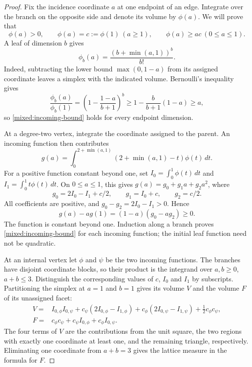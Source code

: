 \begin{proof}
Fix the incidence coordinate $a$ at one endpoint of an edge. Integrate
over the branch on the opposite side and denote its volume by
$\phi(a)$. We will prove that
\begin{equation}\label{mixed:incoming-bound}
 \phi(a)>0,\qquad \phi(a)=c:=\phi(1)\ (a\ge1),\qquad
 \phi(a)\ge ac\ (0\le a\le1).
\end{equation}
A leaf of dimension $b$ gives
\[
 \phi_b(a)=\frac{(b+\min(a,1))^b}{b!}.
\]
Indeed, subtracting the lower bound $\max(0,1-a)$ from its assigned
coordinate leaves a simplex with the indicated volume. Bernoulli's inequality
gives
\[
 \frac{\phi_b(a)}{\phi_b(1)}
 =\left(1-\frac{1-a}{b+1}\right)^b
 \ge1-\frac{b}{b+1}(1-a)\ge a,
\]
so \eqref{mixed:incoming-bound} holds for every endpoint dimension.

At a degree-two vertex, integrate the coordinate assigned to the parent.
An incoming function then contributes
\begin{equation}\label{mixed:path-operator}
 g(a)=\int_0^{2+\min(a,1)}
             (2+\min(a,1)-t)\phi(t)\,dt.
\end{equation}
For a positive function constant beyond one, set
$I_0=\int_0^1\phi(t)\,dt$ and $I_1=\int_0^1t\phi(t)\,dt$.
On $0\le a\le1$, this gives $g(a)=g_0+g_1a+g_2a^2$, where
\[
 g_0=2I_0-I_1+c/2,\qquad g_1=I_0+c,\qquad g_2=c/2.
\]
All coefficients are positive, and $g_0-g_2=2I_0-I_1>0$. Hence
\[
 g(a)-ag(1)=(1-a)(g_0-ag_2)\ge0.
\]
The function is constant beyond one. Induction along a branch proves
\eqref{mixed:incoming-bound} for each incoming function; the initial
leaf function need not be quadratic.

At an internal vertex let $\phi$ and $\psi$ be the two incoming
functions. The branches have disjoint coordinate blocks, so their
product is the integrand over $a,b\ge0$, $a+b\le3$. Distinguish the corresponding values of $c$, $I_0$ and $I_1$ by
subscripts. Partitioning the simplex at $a=1$ and $b=1$ gives its
volume $V$ and the volume $F$ of its unassigned facet:
\begin{align}
 V={}&I_{0,\phi}I_{0,\psi}
   +c_\psi(2I_{0,\phi}-I_{1,\phi})
   +c_\phi(2I_{0,\psi}-I_{1,\psi})
   +\tfrac12c_\phi c_\psi,\label{mixed:path-volume}\\
 F={}&c_\phi c_\psi+c_\psi I_{0,\phi}+c_\phi I_{0,\psi}.
 \label{mixed:path-facet}
\end{align}
The four terms of $V$ are the contributions from the unit square,
the two regions with exactly one coordinate at least one, and the
remaining triangle, respectively. Eliminating one coordinate from $a+b=3$ gives the lattice
measure in the formula for $F$.


\end{proof}
